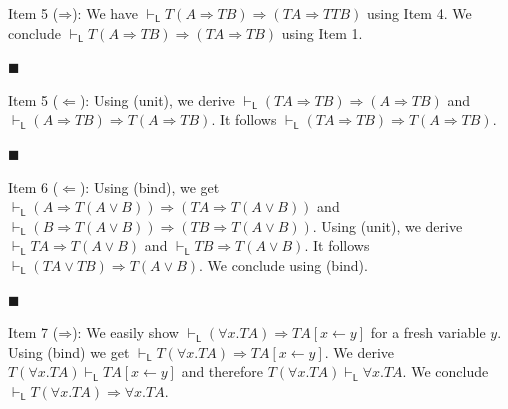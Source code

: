 \documentclass[10pt,a4paper]{article}
\begin{document}
Item 5 ($\mathbin{\Rightarrow}$): We have $\vdash_{\mathsf{L}}T(A\mathbin{\Rightarrow}TB)\mathbin{\Rightarrow}(TA\mathbin{\Rightarrow}TTB)$ using Item 4. We conclude $\vdash_{\mathsf{L}}T(A\mathbin{\Rightarrow}TB)\mathbin{\Rightarrow}(TA\mathbin{\Rightarrow}TB)$ using Item 1.\par
 
 
 
\par\noindent  $\blacksquare$ 
 
Item 5 ($\Leftarrow$): Using (unit), we derive $\vdash_{\mathsf{L}}(TA\mathbin{\Rightarrow}TB)\mathbin{\Rightarrow}(A\mathbin{\Rightarrow}TB)$ and $\vdash_{\mathsf{L}}(A\mathbin{\Rightarrow}TB)\mathbin{\Rightarrow}T(A\mathbin{\Rightarrow}TB)$. It follows $\vdash_{\mathsf{L}}(TA\mathbin{\Rightarrow}TB)\mathbin{\Rightarrow}T(A\mathbin{\Rightarrow}TB)$.\par
 
 
 
\par\noindent  $\blacksquare$ 
 
Item 6 ($\Leftarrow$): Using (bind), we get $\vdash_{\mathsf{L}}(A\mathbin{\Rightarrow}T(A\mathbin{\vee}B))\mathbin{\Rightarrow}(TA\mathbin{\Rightarrow}T(A\mathbin{\vee}B))$ and $\vdash_{\mathsf{L}}(B\mathbin{\Rightarrow}T(A\mathbin{\vee}B))\mathbin{\Rightarrow}(TB\mathbin{\Rightarrow}T(A\mathbin{\vee}B))$. Using (unit), we derive $\vdash_{\mathsf{L}}TA\mathbin{\Rightarrow}T(A\mathbin{\vee}B)$ and $\vdash_{\mathsf{L}}TB\mathbin{\Rightarrow}T(A\mathbin{\vee}B)$. It follows $\vdash_{\mathsf{L}}(TA\mathbin{\vee}TB)\mathbin{\Rightarrow}T(A\mathbin{\vee}B)$. We conclude using (bind).\par
 
 
 
\par\noindent  $\blacksquare$ 
 
Item 7 ($\mathbin{\Rightarrow}$): We easily show $\vdash_{\mathsf{L}}({\forall}x.TA)\mathbin{\Rightarrow}TA[x\leftarrow y]$ for a fresh variable $y$. Using (bind) we get $\vdash_{\mathsf{L}}T({\forall}x.TA)\mathbin{\Rightarrow}TA[x\leftarrow y]$. We derive $T({\forall}x.TA)\vdash_{\mathsf{L}}TA[x\leftarrow y]$ and therefore $T({\forall}x.TA)\vdash_{\mathsf{L}}{\forall}x.TA$. We conclude $\vdash_{\mathsf{L}}T({\forall}x.TA)\mathbin{\Rightarrow}{\forall}x.TA$.\par
 
\end{document}
